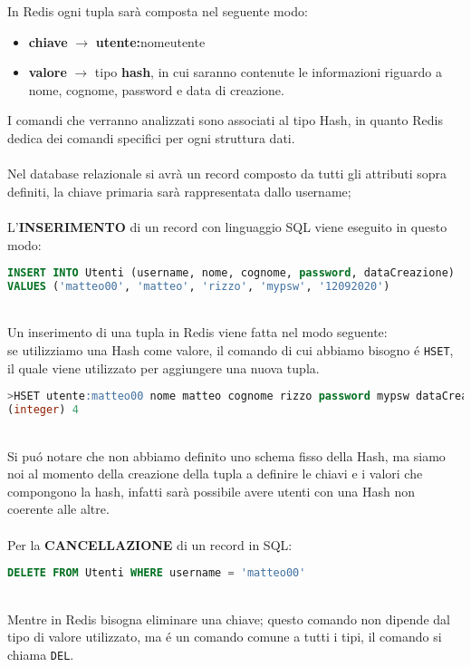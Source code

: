 In Redis ogni tupla sarà composta nel seguente modo:
\begin{itemize}
    \item \textbf{chiave} $\to$ \textbf{utente:}nomeutente
    \item \textbf{valore} $\to$ tipo \textbf{hash}, in cui saranno contenute le informazioni riguardo a nome, cognome, password e data di creazione.
\end{itemize}
I comandi che verranno analizzati sono associati al tipo Hash, in quanto Redis dedica dei comandi specifici per ogni struttura dati.\\
\\
Nel database relazionale si avrà un record composto da tutti gli attributi sopra definiti, la chiave primaria sarà rappresentata dallo username;\\
\\
L'\textbf{INSERIMENTO} di un record con linguaggio SQL viene eseguito in questo modo:
\begin{lstlisting}[autogobble, style=redis-cli, language=SQL]
INSERT INTO Utenti (username, nome, cognome, password, dataCreazione)
VALUES ('matteo00', 'matteo', 'rizzo', 'mypsw', '12092020')\end{lstlisting}
\\
Un inserimento di una tupla in Redis viene fatta nel modo seguente:\\
se utilizziamo una Hash come valore, il comando di cui abbiamo bisogno é \texttt{HSET}, il quale viene utilizzato per aggiungere una nuova tupla.
\begin{lstlisting}[autogobble, style=redis-cli, language=SQL]
>HSET utente:matteo00 nome matteo cognome rizzo password mypsw dataCreazione 12092020
(integer) 4\end{lstlisting}
\\
Si puó notare che non abbiamo definito uno schema fisso della Hash, ma siamo noi al momento della creazione della tupla a definire le chiavi e i valori che compongono la hash,
infatti sarà possibile avere utenti con una Hash non coerente alle altre.\\
\\
Per la \textbf{CANCELLAZIONE} di un record in SQL:
\begin{lstlisting}[autogobble, style=redis-cli, language=SQL]
DELETE FROM Utenti WHERE username = 'matteo00'\end{lstlisting}
\\
Mentre in Redis bisogna eliminare una chiave; questo comando non dipende dal tipo di valore utilizzato, ma é un comando comune
a tutti i tipi, il comando si chiama \texttt{DEL}.

